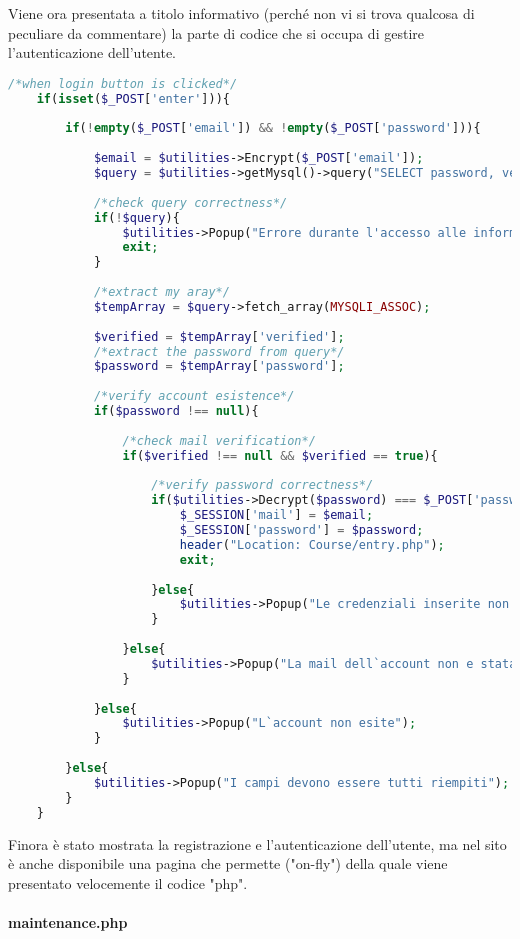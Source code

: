  Viene ora presentata a titolo informativo (perché non vi si trova qualcosa di peculiare da commentare) la parte di codice che si occupa di gestire l'autenticazione dell'utente.\\ 

\begin{lstlisting}[language=php]
	/*when login button is clicked*/
	if(isset($_POST['enter'])){
		
		if(!empty($_POST['email']) && !empty($_POST['password'])){
			
			$email = $utilities->Encrypt($_POST['email']);
			$query = $utilities->getMysql()->query("SELECT password, verified FROM user_table1 WHERE (email = '{$email}')");
			
			/*check query correctness*/
			if(!$query){
				$utilities->Popup("Errore durante l'accesso alle informazioni");
				exit;
			}
			
			/*extract my aray*/
			$tempArray = $query->fetch_array(MYSQLI_ASSOC);
			
			$verified = $tempArray['verified'];
			/*extract the password from query*/
			$password = $tempArray['password'];
			
			/*verify account esistence*/  
			if($password !== null){
				
				/*check mail verification*/
				if($verified !== null && $verified == true){
					
					/*verify password correctness*/
					if($utilities->Decrypt($password) === $_POST['password']){
						$_SESSION['mail'] = $email;
						$_SESSION['password'] = $password;
						header("Location: Course/entry.php");
						exit;
						
					}else{
						$utilities->Popup("Le credenziali inserite non sono corrette");
					}
					
				}else{
					$utilities->Popup("La mail dell`account non e stata verificata.");
				}
				
			}else{
				$utilities->Popup("L`account non esite");
			}
			
		}else{
			$utilities->Popup("I campi devono essere tutti riempiti");
		}
	}
\end{lstlisting}

Finora è stato mostrata la registrazione e l'autenticazione dell'utente, ma nel sito è anche disponibile una pagina che permette ("on-fly") della quale viene presentato velocemente il codice "php".\\

\paragraph{maintenance.php}\leavevmode\\


